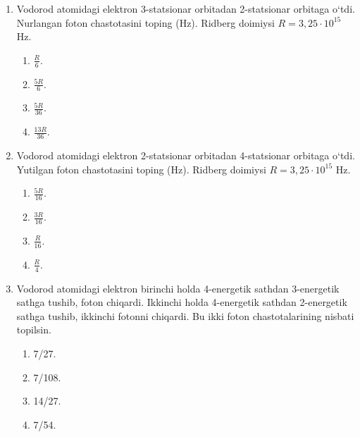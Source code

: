 \begin{enumerate}
\begin{center}
\end{center}

\begin{enumerate}[label=\Alph*)]
\item 5.
\item 4.
\item 3.
\item 2.
\end{enumerate}

\item Vodorod atomidagi elektron 3-statsionar orbitadan 2-statsionar orbitaga o‘tdi. Nurlangan foton chastotasini toping (Hz). Ridberg doimiysi $R=3,25\cdot 10^{15}$ Hz.
\begin{enumerate}[label=\Alph*)]
\item $\frac{R}{6}$.
\item $\frac{5R}{6}$.
\item $\frac{5R}{36}$.
\item $\frac{13R}{36}$.
\end{enumerate}

\item Vodorod atomidagi elektron 2-statsionar orbitadan 4-statsionar orbitaga o‘tdi. Yutilgan foton chastotasini toping (Hz). Ridberg doimiysi $R=3,25\cdot 10^{15}$ Hz.
\begin{enumerate}[label=\Alph*)]
\item $\frac{5R}{16}$.
\item $\frac{3R}{16}$.
\item $\frac{R}{16}$.
\item $\frac{R}{4}$.
\end{enumerate}

\item Vodorod atomidagi elektron birinchi holda 4-energetik sathdan 3-energetik sathga tushib, foton chiqardi. Ikkinchi holda 4-energetik sathdan 2-energetik sathga tushib, ikkinchi fotonni chiqardi. Bu ikki foton chastotalarining nisbati topilsin.
\begin{enumerate}[label=\Alph*)]
\item 7/27.
\item 7/108.
\item 14/27.
\item 7/54.
\end{enumerate}


\end{enumerate}
